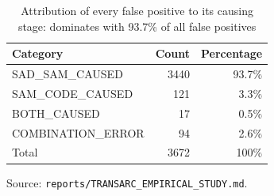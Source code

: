 \begin{table}[htbp]
  \centering
  \caption{Attribution of every \transarc false positive to its causing stage: \sadsam dominates with 93.7\% of all false positives}
  \label{tab:fp-attribution}
  \begin{tabular}{lrr}
    \toprule
    Category & Count & Percentage \\
    \midrule
    SAD\_SAM\_CAUSED & 3440 & 93.7\% \\
    SAM\_CODE\_CAUSED & 121 & 3.3\% \\
    BOTH\_CAUSED & 17 & 0.5\% \\
    COMBINATION\_ERROR & 94 & 2.6\% \\
    Total & 3672 & 100\% \\
    \bottomrule
  \end{tabular}
  \par\smallskip\footnotesize Source: \texttt{reports/TRANSARC\_EMPIRICAL\_STUDY.md}.
\end{table}
